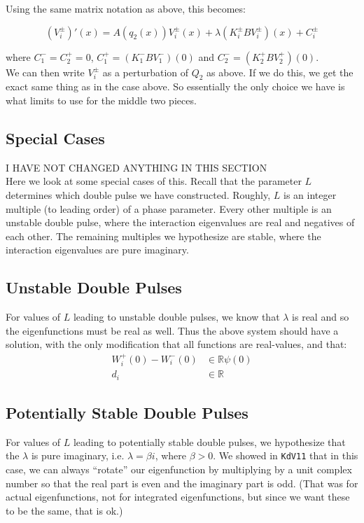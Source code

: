 \documentclass[12pt]{article}
\def\R{{\mathbb R}}
\begin{document}
Using the same matrix notation as above, this becomes:

\[
(V_i^\pm)'(x) = A(q_2(x)) V_i^\pm(x) + \lambda (K_i^\pm B V_i^\pm)(x) + C_i^\pm
\]

where $C_1^- = C_2^+ = 0$, $C_1^+ = (K_1^- B V_1^-)(0)$ and $C_2^- = (K_2^+ B V_2^+)(0)$.\\ 

We can then write $V_i^\pm$ as a perturbation of $Q_2$ as above. If we do this, we get the exact same thing as in the case above. So essentially the only choice we have is what limits to use for the middle two pieces. 

\subsection*{Special Cases}

I HAVE NOT CHANGED ANYTHING IN THIS SECTION \\

Here we look at some special cases of this. Recall that the parameter $L$ determines which double pulse we have constructed. Roughly, $L$ is an integer multiple (to leading order) of a phase parameter. Every other multiple is an unstable double pulse, where the interaction eigenvalues are real and negatives of each other. The remaining multiples we hypothesize are stable, where the interaction eigenvalues are pure imaginary.\\

\subsection*{Unstable Double Pulses}
For values of $L$ leading to unstable double pulses, we know that $\lambda$ is real and so the eigenfunctions must be real as well. Thus the above system should have a solution, with the only modification that all functions are real-values, and that:
\begin{align*}
W_i^+(0) - W_i^-(0) &\in \R \psi(0) \\
d_i &\in \R
\end{align*}

\subsection*{Potentially Stable Double Pulses}
For values of $L$ leading to potentially stable double pulses, we hypothesize that the $\lambda$ is pure imaginary, i.e. $\lambda = \beta i$, where $\beta > 0$. We showed in \texttt{KdV11} that in this case, we can always ``rotate'' our eigenfunction by multiplying by a unit complex number so that the real part is even and the imaginary part is odd. (That was for actual eigenfunctions, not for integrated eigenfunctions, but since we want these to be the same, that is ok.)\\
\end{document}

